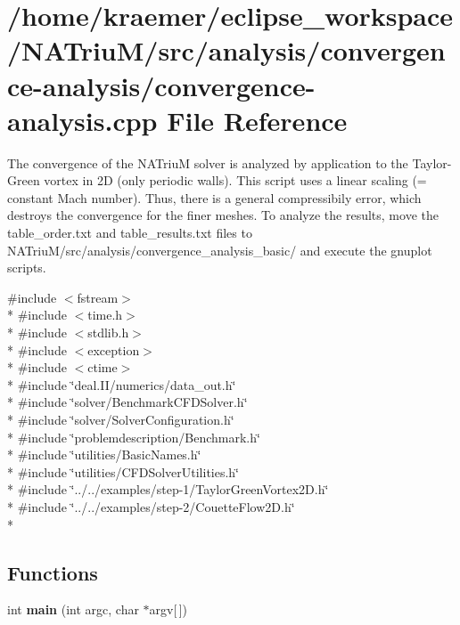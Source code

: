 \hypertarget{convergence-analysis_8cpp}{\section{/home/kraemer/eclipse\-\_\-workspace/\-N\-A\-Triu\-M/src/analysis/convergence-\/analysis/convergence-\/analysis.cpp File Reference}
\label{convergence-analysis_8cpp}
}


The convergence of the N\-A\-Triu\-M solver is analyzed by application to the Taylor-\/\-Green vortex in 2\-D (only periodic walls). This script uses a linear scaling (= constant Mach number). Thus, there is a general compressibily error, which destroys the convergence for the finer meshes. To analyze the results, move the table\-\_\-order.\-txt and table\-\_\-results.\-txt files to N\-A\-Triu\-M/src/analysis/convergence\-\_\-analysis\-\_\-basic/ and execute the gnuplot scripts.  


{\ttfamily \#include $<$fstream$>$}\\*
{\ttfamily \#include $<$time.\-h$>$}\\*
{\ttfamily \#include $<$stdlib.\-h$>$}\\*
{\ttfamily \#include $<$exception$>$}\\*
{\ttfamily \#include $<$ctime$>$}\\*
{\ttfamily \#include \char`\"{}deal.\-I\-I/numerics/data\-\_\-out.\-h\char`\"{}}\\*
{\ttfamily \#include \char`\"{}solver/\-Benchmark\-C\-F\-D\-Solver.\-h\char`\"{}}\\*
{\ttfamily \#include \char`\"{}solver/\-Solver\-Configuration.\-h\char`\"{}}\\*
{\ttfamily \#include \char`\"{}problemdescription/\-Benchmark.\-h\char`\"{}}\\*
{\ttfamily \#include \char`\"{}utilities/\-Basic\-Names.\-h\char`\"{}}\\*
{\ttfamily \#include \char`\"{}utilities/\-C\-F\-D\-Solver\-Utilities.\-h\char`\"{}}\\*
{\ttfamily \#include \char`\"{}../../examples/step-\/1/\-Taylor\-Green\-Vortex2\-D.\-h\char`\"{}}\\*
{\ttfamily \#include \char`\"{}../../examples/step-\/2/\-Couette\-Flow2\-D.\-h\char`\"{}}\\*
\subsection*{Functions}
\begin{DoxyCompactItemize}
\item 
\hypertarget{convergence-analysis_8cpp_a0ddf1224851353fc92bfbff6f499fa97}{int {\bfseries main} (int argc, char $\ast$argv\mbox{[}$\,$\mbox{]})}\label{convergence-analysis_8cpp_a0ddf1224851353fc92bfbff6f499fa97}

\end{DoxyCompactItemize}


